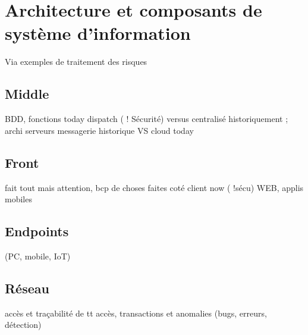 

\section{Architecture et composants de système d’information}
Via exemples de traitement des risques 

\subsection{Middle}
BDD, fonctions today dispatch ( ! Sécurité) versus centralisé historiquement ; archi serveurs messagerie historique VS cloud today
\subsection{Front}
fait tout mais attention, bcp de choses faites coté client now ( !sécu)
WEB, applis mobiles
\subsection{Endpoints} 
(PC, mobile, IoT)
\subsection{Réseau} 
accès et traçabilité de tt accès, transactions et anomalies (bugs, erreurs, détection)

